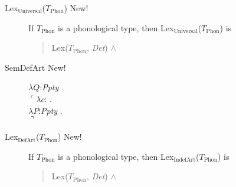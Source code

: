 \begin{description}
  
\item[\textnormal{Lex$_{\mathrm{Universal}}$($T_{\mathrm{Phon}}$)}
        New!]
        \mbox{}

        If $T_{\mathrm{Phon}}$ is a phonological type, then
        Lex$_{\mathrm{Universal}}$($T_{\mathrm{Phon}}$) is
        \begin{quote}
          Lex($T_{\mathrm{Phon}}$, \textit{Det}) \d{$\wedge$}
        \end{quote}

        \item[\textnormal{SemDefArt} New!] \mbox{}


          $\lambda Q$:\textit{Ppty} . \\
          \hspace*{1em}$\ulcorner\lambda c$: . \\
  \hspace*{2em}$\lambda P$:\textit{Ppty} . \\
  \hspace*{3em}$\urcorner$

        
      \item[\textnormal{Lex$_{\mathrm{DefArt}}$($T_{\mathrm{Phon}}$)} New!]
        \mbox{}

        If $T_{\mathrm{Phon}}$ is a phonological type, then
        Lex$_{\mathrm{IndefArt}}$($T_{\mathrm{Phon}}$) is
        \begin{quote}
          Lex($T_{\mathrm{Phon}}$, \textit{Det}) \d{$\wedge$}
        \end{quote}


\end{description}
